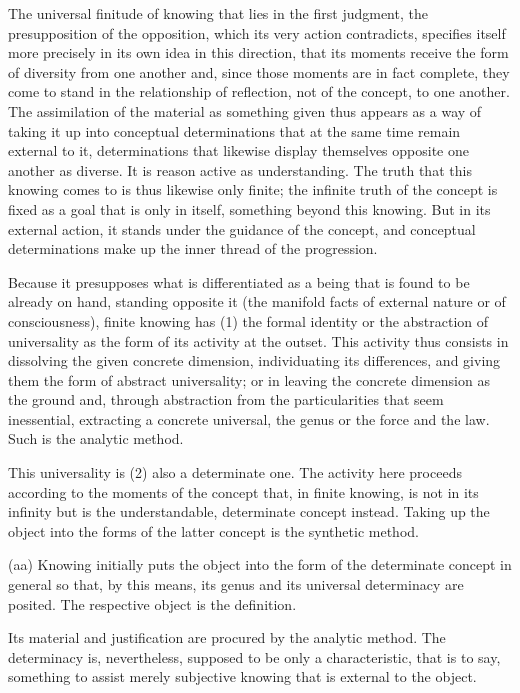 The universal finitude of knowing that lies in the first judgment,
the presupposition of the opposition, which its very action contradicts,
specifies itself more precisely in its own idea in this direction,
that its moments receive the form of diversity from one another and,
since those moments are in fact complete, they come to stand in
the relationship of reflection, not of the concept, to one another.
The assimilation of the material as something given thus appears as
a way of taking it up into conceptual determinations that at the same time
remain external to it, determinations that likewise display themselves
opposite one another as diverse.
It is reason active as understanding.
The truth that this knowing comes to is thus likewise only finite;
the infinite truth of the concept is fixed as a goal that is only in itself,
something beyond this knowing.
But in its external action, it stands under the guidance of the concept,
and conceptual determinations make up the inner thread of the progression.

Because it presupposes what is differentiated
as a being that is found to be already on hand, standing opposite it
(the manifold facts of external nature or of consciousness),
finite knowing has
(1) the formal identity or
the abstraction of universality
as the form of its activity at the outset.
This activity thus consists in
dissolving the given concrete dimension,
individuating its differences,
and giving them the form of abstract universality;
or in leaving the concrete dimension as the ground and,
through abstraction from the particularities that seem inessential,
extracting a concrete universal,
the genus or the force and the law.
Such is the analytic method.

This universality is
(2) also a determinate one.
The activity here proceeds according to the moments of
the concept that, in finite knowing, is not in its infinity
but is the understandable, determinate concept instead.
Taking up the object into the forms of the latter concept
is the synthetic method.

(aa) Knowing initially puts the object into the form of
the determinate concept in general so that, by this means,
its genus and its universal determinacy are posited.
The respective object is the definition.

Its material and justification are procured by the analytic method.
The determinacy is, nevertheless, supposed to be only a characteristic,
that is to say, something to assist merely subjective knowing
that is external to the object.

